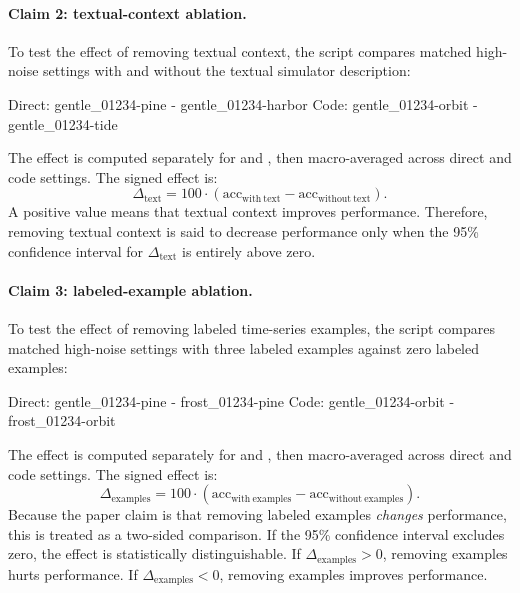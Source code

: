 \documentclass[11pt]{article}
\begin{document}
\paragraph{Claim 2: textual-context ablation.}
To test the effect of removing textual context, the script compares matched high-noise settings with and without the textual simulator description:
\begin{DocCode}
Direct: gentle_01234-pine  - gentle_01234-harbor
Code:   gentle_01234-orbit - gentle_01234-tide
\end{DocCode}
The effect is computed separately for  and , then macro-averaged across direct and code settings.
The signed effect is:
\[
\Delta_{\mathrm{text}}
=
100 \cdot
\left(
\mathrm{acc}_{\mathrm{with\ text}}
-
\mathrm{acc}_{\mathrm{without\ text}}
\right).
\]
A positive value means that textual context improves performance.
Therefore, removing textual context is said to decrease performance only when the 95\% confidence interval for \(\Delta_{\mathrm{text}}\) is entirely above zero.

\paragraph{Claim 3: labeled-example ablation.}
To test the effect of removing labeled time-series examples, the script compares matched high-noise settings with three labeled examples against zero labeled examples:
\begin{DocCode}
Direct: gentle_01234-pine  - frost_01234-pine
Code:   gentle_01234-orbit - frost_01234-orbit
\end{DocCode}
The effect is computed separately for  and , then macro-averaged across direct and code settings.
The signed effect is:
\[
\Delta_{\mathrm{examples}}
=
100 \cdot
\left(
\mathrm{acc}_{\mathrm{with\ examples}}
-
\mathrm{acc}_{\mathrm{without\ examples}}
\right).
\]
Because the paper claim is that removing labeled examples \emph{changes} performance, this is treated as a two-sided comparison.
If the 95\% confidence interval excludes zero, the effect is statistically distinguishable.
If \(\Delta_{\mathrm{examples}}>0\), removing examples hurts performance.
If \(\Delta_{\mathrm{examples}}<0\), removing examples improves performance.
\end{document}
